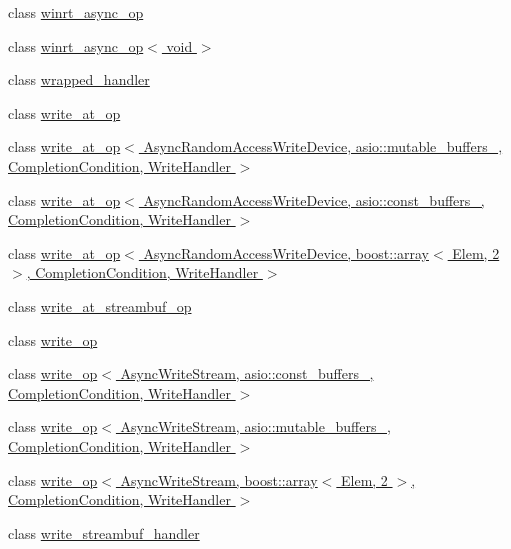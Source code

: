 \begin{DoxyCompactItemize}
class \hyperlink{classasio_1_1detail_1_1winrt__async__op}{winrt\+\_\+async\+\_\+op}
\item 
class \hyperlink{classasio_1_1detail_1_1winrt__async__op_3_01void_01_4}{winrt\+\_\+async\+\_\+op$<$ void $>$}
\item 
class \hyperlink{classasio_1_1detail_1_1wrapped__handler}{wrapped\+\_\+handler}
\item 
class \hyperlink{classasio_1_1detail_1_1write__at__op}{write\+\_\+at\+\_\+op}
\item 
class \hyperlink{classasio_1_1detail_1_1write__at__op_3_01_async_random_access_write_device_00_01_01_01_01_01_01_9c63ca7e3422e806874cb49cd5be5156}{write\+\_\+at\+\_\+op$<$ Async\+Random\+Access\+Write\+Device,                           asio\+::mutable\+\_\+buffers\+\_, Completion\+Condition, Write\+Handler $>$}
\item 
class \hyperlink{classasio_1_1detail_1_1write__at__op_3_01_async_random_access_write_device_00_01asio_1_1const__bfac42b27d8d08bd8bf66a7fd473767cd}{write\+\_\+at\+\_\+op$<$ Async\+Random\+Access\+Write\+Device, asio\+::const\+\_\+buffers\+\_,                           Completion\+Condition, Write\+Handler $>$}
\item 
class \hyperlink{classasio_1_1detail_1_1write__at__op_3_01_async_random_access_write_device_00_01boost_1_1array_3e439bc739a816bec12c3cd7d54fe10a0}{write\+\_\+at\+\_\+op$<$ Async\+Random\+Access\+Write\+Device, boost\+::array$<$ Elem, 2 $>$,                           Completion\+Condition, Write\+Handler $>$}
\item 
class \hyperlink{classasio_1_1detail_1_1write__at__streambuf__op}{write\+\_\+at\+\_\+streambuf\+\_\+op}
\item 
class \hyperlink{classasio_1_1detail_1_1write__op}{write\+\_\+op}
\item 
class \hyperlink{classasio_1_1detail_1_1write__op_3_01_async_write_stream_00_01asio_1_1const__buffers__1_00_01_014e1524567dd7f87180ace12b51858864}{write\+\_\+op$<$ Async\+Write\+Stream, asio\+::const\+\_\+buffers\+\_,                           Completion\+Condition, Write\+Handler $>$}
\item 
class \hyperlink{classasio_1_1detail_1_1write__op_3_01_async_write_stream_00_01asio_1_1mutable__buffers__1_00_01_203e79af9e8ed472722d2a863f7168cc}{write\+\_\+op$<$ Async\+Write\+Stream, asio\+::mutable\+\_\+buffers\+\_,                           Completion\+Condition, Write\+Handler $>$}
\item 
class \hyperlink{classasio_1_1detail_1_1write__op_3_01_async_write_stream_00_01boost_1_1array_3_01_elem_00_012_018cbe26fbc46920cd28943bf9ace97230}{write\+\_\+op$<$ Async\+Write\+Stream, boost\+::array$<$ Elem, 2 $>$,                           Completion\+Condition, Write\+Handler $>$}
\item 
class \hyperlink{classasio_1_1detail_1_1write__streambuf__handler}{write\+\_\+streambuf\+\_\+handler}
\end{DoxyCompactItemize}
